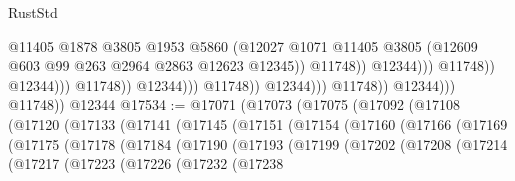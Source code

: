 \begin{lexlean}{RustStd}
\begin{coremodule}
                                                          @11405
                                                          @1878
                                                          @3805
                                                          @1953
                                                          @5860
                                                          (@12027
                                                            @1071
                                                            @11405
                                                            @3805
                                                            (@12609
                                                              @603
                                                              @99
                                                              @263
                                                              @2964
                                                              @2863
                                                              @12623
                                                              @12345))
                                                          @11748))
                                                      @12344)))
                                                @11748))
                                            @12344)))
                                      @11748))
                                  @12344)))
                            @11748))
                        @12344)))
                  @11748))
              @12344)))
        @11748))
    @12344
@17534 := @17071
    (@17073
      (@17075
        (@17092
          (@17108
            (@17120
              (@17133
                (@17141
                  (@17145
                    (@17151
                      (@17154
                        (@17160
                          (@17166
                            (@17169
                              (@17175
                                (@17178
                                  (@17184
                                    (@17190
                                      (@17193
                                        (@17199
                                          (@17202
                                            (@17208
                                              (@17214
                                                (@17217
                                                  (@17223
                                                    (@17226
                                                      (@17232
                                                        (@17238

\end{coremodule}
\end{lexlean}
